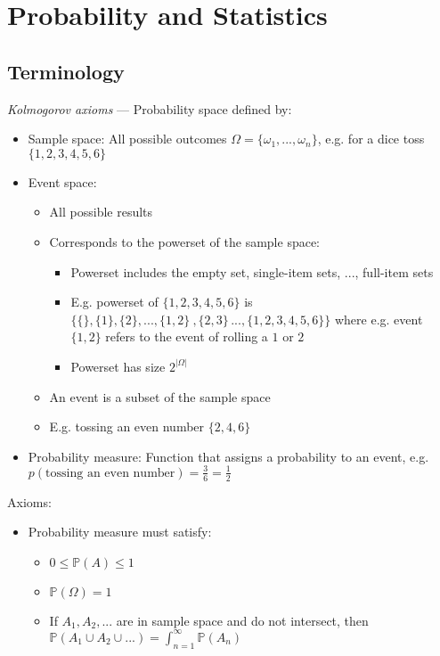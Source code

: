 \section{Probability and Statistics}
\subsection*{Terminology}
\emph{Kolmogorov axioms} --- 
Probability space defined by:
\begin{itemize}
    \item Sample space: All possible outcomes $\Omega = \{\omega_1,...,\omega_n\}$, e.g. for a dice toss $\{ 1,2,3,4,5,6 \}$
    \item Event space: 
    \begin{itemize}
        \item All possible results
        \item Corresponds to the powerset of the sample space:
        \begin{itemize}
            \item Powerset includes the empty set, single-item sets, ..., full-item sets
            \item E.g. powerset of $\{ 1,2,3,4,5,6 \}$ is $\{ \{\}, \{1\}, \{2\}, ..., \{1,2\}\ ,  \{2,3\}\, ...,  \{1,2,3,4,5,6\}\}$ where e.g. event $\{1,2\}$ refers to the event of rolling a $1$ or $2$
            \item Powerset has size $2^{|\Omega|}$
        \end{itemize}
        \item An event is a subset of the sample space
        \item E.g. tossing an even number $\{ 2,4,6 \}$
    \end{itemize}
    \item Probability measure: Function that assigns a probability to an event, e.g. $p(\textrm{tossing an even number}) = \frac{3}{6} = \frac{1}{2}$ 
\end{itemize}
Axioms:
\begin{itemize}
    \item Probability measure must satisfy:
    \begin{itemize}
        \item $0 \leq \mathbb{P}(A) \leq 1$
        \item $\mathbb{P}({\Omega}) = 1$
        \item If $A_1,A_2,...$ are in sample space and do not intersect, then $\mathbb{P}(A_1 \cup A_2 \cup ...) = \int_{n=1}^{\infty} \mathbb{P}(A_n)$
    \end{itemize}
\end{itemize}

